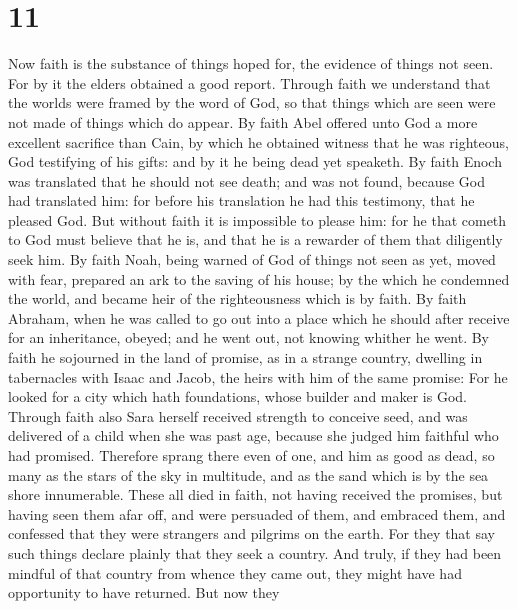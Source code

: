 \hypertarget{section-10}{%
\section{11}\label{section-10}}

 Now faith is the substance of things hoped for, the
evidence of things not seen.  For by it the elders obtained
a good report.  Through faith we understand that the worlds
were framed by the word of God, so that things which are seen were not
made of things which do appear.  By faith Abel offered unto
God a more excellent sacrifice than Cain, by which he obtained witness
that he was righteous, God testifying of his gifts: and by it he being
dead yet speaketh.  By faith Enoch was translated that he
should not see death; and was not found, because God had translated him:
for before his translation he had this testimony, that he pleased God.
 But without faith it is impossible to please him: for he
that cometh to God must believe that he is, and that he is a rewarder of
them that diligently seek him.  By faith Noah, being warned
of God of things not seen as yet, moved with fear, prepared an ark to
the saving of his house; by the which he condemned the world, and became
heir of the righteousness which is by faith.  By faith
Abraham, when he was called to go out into a place which he should after
receive for an inheritance, obeyed; and he went out, not knowing whither
he went.  By faith he sojourned in the land of promise, as
in a strange country, dwelling in tabernacles with Isaac and Jacob, the
heirs with him of the same promise:  For he looked for a
city which hath foundations, whose builder and maker is God.
 Through faith also Sara herself received strength to
conceive seed, and was delivered of a child when she was past age,
because she judged him faithful who had promised. 
Therefore sprang there even of one, and him as good as dead, so many as
the stars of the sky in multitude, and as the sand which is by the sea
shore innumerable.  These all died in faith, not having
received the promises, but having seen them afar off, and were persuaded
of them, and embraced them, and confessed that they were strangers and
pilgrims on the earth.  For they that say such things
declare plainly that they seek a country.  And truly, if
they had been mindful of that country from whence they came out, they
might have had opportunity to have returned.  But now they
